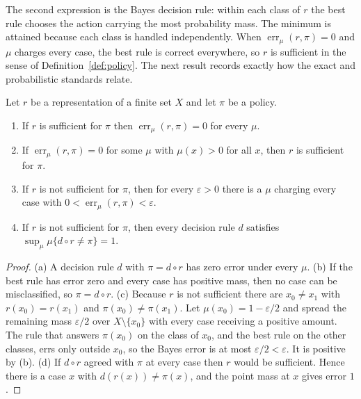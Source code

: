 The second expression is the Bayes decision rule: within each class of $r$ the best rule chooses the action carrying the most probability mass. The minimum is attained because each class is handled independently. When $\operatorname{err}_\mu(r,\pi)=0$ and $\mu$ charges every case, the best rule is correct everywhere, so $r$ is sufficient in the sense of Definition~\ref{def:policy}. The next result records exactly how the exact and probabilistic standards relate.

\begin{newresult}\label{thm:exact-vs-average}
Let $r$ be a representation of a finite set $X$ and let $\pi$ be a policy.
\begin{enumerate}[nosep,label=(\alph*)]
  \item If $r$ is sufficient for $\pi$ then $\operatorname{err}_\mu(r,\pi)=0$ for every $\mu$.
  \item If $\operatorname{err}_\mu(r,\pi)=0$ for some $\mu$ with $\mu(x)>0$ for all $x$, then $r$ is sufficient for $\pi$.
  \item If $r$ is not sufficient for $\pi$, then for every $\varepsilon>0$ there is a $\mu$ charging every case with $0<\operatorname{err}_\mu(r,\pi)<\varepsilon$.
  \item If $r$ is not sufficient for $\pi$, then every decision rule $d$ satisfies $\sup_\mu\mu\{d\circ r\ne\pi\}=1$.
\end{enumerate}
\end{newresult}
\begin{proof}
(a) A decision rule $d$ with $\pi=d\circ r$ has zero error under every $\mu$. (b) If the best rule has error zero and every case has positive mass, then no case can be misclassified, so $\pi=d\circ r$. (c) Because $r$ is not sufficient there are $x_0\ne x_1$ with $r(x_0)=r(x_1)$ and $\pi(x_0)\ne\pi(x_1)$. Let $\mu(x_0)=1-\varepsilon/2$ and spread the remaining mass $\varepsilon/2$ over $X\setminus\{x_0\}$ with every case receiving a positive amount. The rule that answers $\pi(x_0)$ on the class of $x_0$, and the best rule on the other classes, errs only outside $x_0$, so the Bayes error is at most $\varepsilon/2<\varepsilon$. It is positive by (b). (d) If $d\circ r$ agreed with $\pi$ at every case then $r$ would be sufficient. Hence there is a case $x$ with $d(r(x))\ne\pi(x)$, and the point mass at $x$ gives error $1$.
\end{proof}

